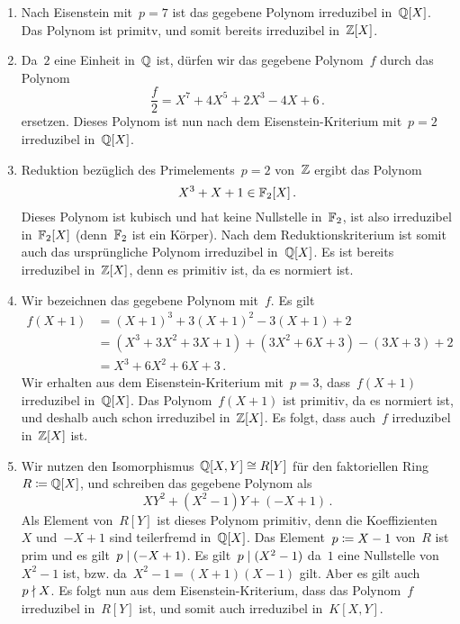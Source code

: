 \documentclass{scrartcl}
\begin{document}
\begin{solution}
  \begin{enumerate}
    \item
      Nach Eisenstein mit~$p = 7$ ist das gegebene Polynom irreduzibel in~$\mathbb{Q}[X]$.
      Das Polynom ist primitv, und somit bereits irreduzibel in~$\mathbb{Z}[X]$.
    \item
      Da~$2$ eine Einheit in~$\mathbb{Q}$ ist, dürfen wir das gegebene Polynom~$f$ durch das Polynom
      \[
        \frac{f}{2}
        =
        X^7 + 4 X^5 + 2 X^3 - 4 X + 6 \,.
      \]
      ersetzen.
      Dieses Polynom ist nun nach dem Eisenstein-Kriterium mit~$p = 2$ irreduzibel in~$\mathbb{Q}[X]$.
    \item
     Reduktion bezüglich des Primelements~$p = 2$ von~$\mathbb{Z}$ ergibt das Polynom
     \[
       X^3 + X + 1 \in \mathbb{F}_2[X] \,.
     \]
     Dieses Polynom ist kubisch und hat keine Nullstelle in~$\mathbb{F}_2$, ist also irreduzibel in~$\mathbb{F}_2[X]$ (denn~$\mathbb{F}_2$ ist ein Körper).
     Nach dem Reduktionskriterium ist somit auch das ursprüngliche Polynom irreduzibel in~$\mathbb{Q}[X]$.
     Es ist bereits irreduzibel in~$\mathbb{Z}[X]$, denn es primitiv ist, da es normiert ist.
   \item
     Wir bezeichnen das gegebene Polynom mit~$f$.
     Es gilt
     \begin{align*}
       f(X + 1)
       &=
       (X+1)^3 + 3 (X+1)^2 - 3 (X+1) + 2
       \\
       &=
       (X^3 + 3 X^2 + 3 X + 1) + (3 X^2 + 6 X + 3) - (3X + 3) + 2
       \\
       &=
       X^3 + 6 X^2 + 6 X + 3 \,.
     \end{align*}
     Wir erhalten aus dem Eisenstein-Kriterium mit~$p = 3$, dass~$f(X+1)$ irreduzibel in~$\mathbb{Q}[X]$.
     Das Polynom~$f(X+1)$ ist primitiv, da es normiert ist, und deshalb auch schon irreduzibel in~$\mathbb{Z}[X]$.
     Es folgt, dass auch~$f$ irreduzibel in~$\mathbb{Z}[X]$ ist.
   \item
     Wir nutzen den Isomorphismus~$\mathbb{Q}[X,Y] \cong R[Y]$ für den faktoriellen Ring~$R \coloneqq \mathbb{Q}[X]$, und schreiben das gegebene Polynom als
     \[
       X Y^2 + (X^2 - 1) Y + (-X + 1) \,.
     \]
     Als Element von~$R[Y]$ ist dieses Polynom primitiv, denn die Koeffizienten~$X$ und~$-X+1$ sind teilerfremd in~$\mathbb{Q}[X]$.
     Das Element~$p \coloneqq X-1$ von~$R$ ist prim und es gilt~$p \mid (-X+1)$.
     Es gilt~$p \mid (X^2 - 1)$ da~$1$ eine Nullstelle von~$X^2 - 1$ ist, bzw. da~$X^2 - 1 = (X+1)(X-1)$ gilt.
     Aber es gilt auch~$p \nmid X$.
     Es folgt nun aus dem Eisenstein-Kriterium, dass das Polynom~$f$ irreduzibel in~$R[Y]$ ist, und somit auch irreduzibel in~$K[X,Y]$.
  \end{enumerate}
\end{solution}
\end{document}
